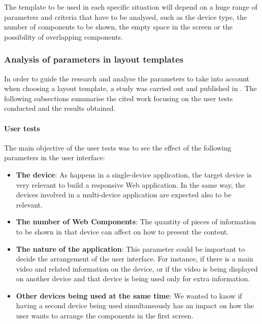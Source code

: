 The template to be used in each specific situation will depend on a huge range of parameters and criteria that have to be analysed, such as the device type, the number of components to be shown, the empty space in the screen or the possibility of overlapping components. 

\subsubsection{Analysis of parameters in layout templates} 
In order to guide the research and analyse the parameters to take into account when choosing a layout template, a study was carried out and published in \cite{zorrilla15bmsb}. The following subsections summarise the cited work focusing on the user tests conducted and the results obtained.  

\paragraph{User tests}

The main objective of the user tests was to see the effect of the following parameters in the user interface:
\begin{itemize}
	\item \textbf{The device}: As happens in a single-device application, the target device is very relevant to build a responsive Web application. In the same way, the devices involved in a multi-device application are expected also to be relevant. 
	\item \textbf{The number of Web Components}: The quantity of pieces of information to be shown in that device can affect on how to present the content.
	\item \textbf{The nature of the application}: This parameter could be important to decide the arrangement of the user interface. For instance, if there is a main video and related information on the device, or if the video is being displayed on another device and that device is being used only for extra information.
	\item \textbf{Other devices being used at the same time}: We wanted to know if having a second device being used simultaneously has an impact on how the user wants to arrange the components in the first screen. 
\end{itemize}


